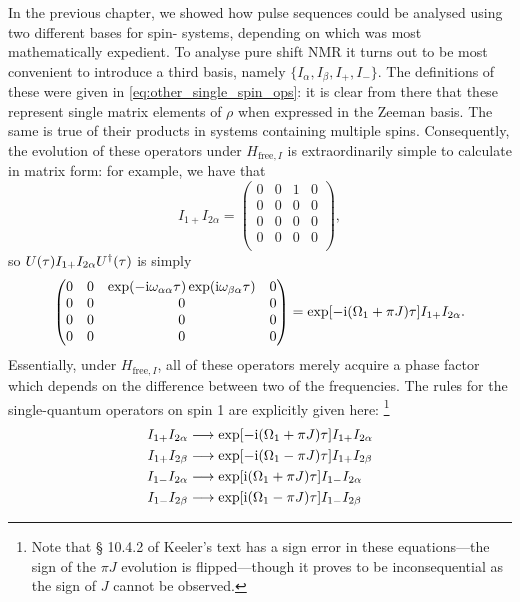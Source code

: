 In the previous chapter, we showed how pulse sequences could be analysed using two different bases for spin-\half{} systems, depending on which was most mathematically expedient.
To analyse pure shift NMR it turns out to be most convenient to introduce a third basis, namely $\{I_\alpha, I_\beta, I_+, I_-\}$\autocite{Keeler2010,Thrippleton2005JMR,Griesinger1986JCP}.
The definitions of these were given in \cref{eq:other_single_spin_ops}: it is clear from there that these represent single matrix elements of $\rho$ when expressed in the Zeeman basis.
The same is true of their products in systems containing multiple spins.
Consequently, the evolution of these operators under $H_{\text{free},I}$ is extraordinarily simple to calculate in matrix form: for example, we have that
\begin{equation}
    \label{eq:single_elem_plusalpha_evolution}
    I_{1+}I_{2\alpha} = \begin{pmatrix}
        0 & 0 & 1 & 0 \\
        0 & 0 & 0 & 0 \\
        0 & 0 & 0 & 0 \\
        0 & 0 & 0 & 0 \\
    \end{pmatrix},
\end{equation}
so $U(\tau) I_{1+} I_{2\alpha} U^\dagger(\tau)$ is simply
\begin{equation}
    \label{eq:single_elem_plusalpha_evolution_2}
    \begin{pmatrix}
        0 & 0 & \exp(-\mathrm{i}\omega_{\alpha\alpha}\tau)\exp(\mathrm{i}\omega_{\beta\alpha}\tau) & 0 \\
        0 & 0 & 0 & 0 \\
        0 & 0 & 0 & 0 \\
        0 & 0 & 0 & 0 \\
    \end{pmatrix} = \exp[-\mathrm{i}(\Omega_1 + \pi J)\tau] I_{1+}I_{2\alpha}.
\end{equation}
Essentially, under $H_{\text{free},I}$, all of these operators merely acquire a phase factor which depends on the difference between two of the frequencies.
The rules for the single-quantum operators on spin 1 are explicitly given here:%
\footnote{Note that \S{} 10.4.2 of Keeler's text\autocite{Keeler2010} has a sign error in these equations---the sign of the $\pi J$ evolution is flipped---though it proves to be inconsequential as the sign of $J$ cannot be observed.}
\begin{align}
    I_{1+}I_{2\alpha} &\longrightarrow \exp[-\mathrm{i}(\Omega_1 + \pi J)\tau] I_{1+}I_{2\alpha} \label{eq:shift_basis_evolution_pa} \\
    I_{1+}I_{2\beta} &\longrightarrow \exp[-\mathrm{i}(\Omega_1 - \pi J)\tau] I_{1+}I_{2\beta} \label{eq:shift_basis_evolution_pb} \\
    I_{1-}I_{2\alpha} &\longrightarrow \exp[\mathrm{i}(\Omega_1 + \pi J)\tau] I_{1-}I_{2\alpha} \label{eq:shift_basis_evolution_ma} \\
    I_{1-}I_{2\beta} &\longrightarrow \exp[\mathrm{i}(\Omega_1 - \pi J)\tau] I_{1-}I_{2\beta} \label{eq:shift_basis_evolution_mb}
\end{align}
